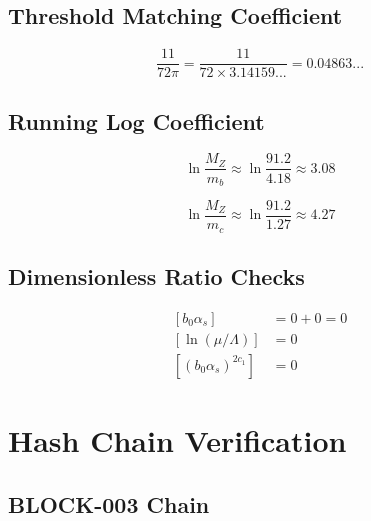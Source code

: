 \documentclass[11pt,a4paper]{article}
\theoremstyle{definition}
\begin{document}
\subsection{Threshold Matching Coefficient}
\label{subsec:app-id-thresh}

\begin{equation}
\label{eq:app-93}
\frac{11}{72\pi} = \frac{11}{72 \times 3.14159...} = 0.04863...
\end{equation}

\subsection{Running Log Coefficient}
\label{subsec:app-id-log}

\begin{equation}
\label{eq:app-94}
\ln\frac{M_Z}{m_b} \approx \ln\frac{91.2}{4.18} \approx 3.08
\end{equation}

\begin{equation}
\label{eq:app-95}
\ln\frac{M_Z}{m_c} \approx \ln\frac{91.2}{1.27} \approx 4.27
\end{equation}

\subsection{Dimensionless Ratio Checks}
\label{subsec:app-id-dim}

\begin{align}
\label{eq:app-96}
[b_0\alpha_s] &= 0 + 0 = 0 \\
\label{eq:app-97}
[\ln(\mu/\Lambda)] &= 0 \\
\label{eq:app-98}
[(b_0\alpha_s)^{2c_1}] &= 0
\end{align}

\section{Hash Chain Verification}
\label{app:hash-verification}

\subsection{BLOCK-003 Chain}
\label{subsec:app-hash-b003}
\end{document}
